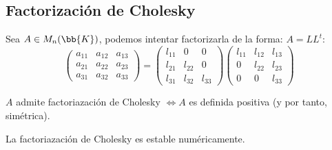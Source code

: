\subsection{Factorización de Cholesky}
\noindent
Sea $A \in M_n(\bb{K})$, podemos intentar factorizarla de la forma: $A=LL^t$:
$$
    \left(
    \begin{array}{ccc}
            a_{11} & a_{12} & a_{13} \\
            a_{21} & a_{22} & a_{23} \\
            a_{31} & a_{32} & a_{33}
        \end{array}
    \right) =
    \left(
    \begin{array}{ccc}
            l_{11} & 0      & 0      \\
            l_{21} & l_{22} & 0      \\
            l_{31} & l_{32} & l_{33}
        \end{array}
    \right)
    \left(
    \begin{array}{ccc}
            l_{11} & l_{12} & l_{13} \\
            0      & l_{22} & l_{23} \\
            0      & 0      & l_{33}
        \end{array}
    \right)
$$

\begin{prop}
    $A$ admite factoriazación de Cholesky $\Leftrightarrow A$ es definida positiva (y por tanto, simétrica).
\end{prop}

\begin{observacion}
    La factoriazación de Cholesky es estable numéricamente.
\end{observacion}

